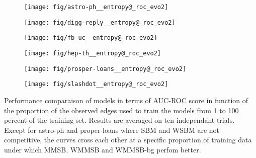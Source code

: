 
\begin{subfigure}
     \centering
         \texttt{[image: fig/astro-ph\_\_entropy@\_roc\_evo2]}
\end{subfigure}
\begin{subfigure}
         \centering
      \texttt{[image: fig/digg-reply\_\_entropy@\_roc\_evo2]}               
\end{subfigure}                                                                          
\begin{subfigure}                                                                        
         \centering                                                                      
      \texttt{[image: fig/fb\_uc\_\_entropy@\_roc\_evo2]}
\end{subfigure}                                                                          
\begin{subfigure}                                                                        
         \centering                                                                      
      \texttt{[image: fig/hep-th\_\_entropy@\_roc\_evo2]}
\end{subfigure}                                                                          
\begin{subfigure}
         \centering
      \texttt{[image: fig/prosper-loans\_\_entropy@\_roc\_evo2]}
\end{subfigure}                                                             
\begin{subfigure}                                                           
         \centering                                                         
      \texttt{[image: fig/slashdot\_\_entropy@\_roc\_evo2]}
\end{subfigure}                                                             
\caption{Performance comparaison of models in terms of AUC-ROC score in function of the proportion of the observed edges used to train the models from 1 to 100 percent of the training set. Results are averaged on ten independant trials. Except for astro-ph and proper-loans where SBM and WSBM are not competitive, the curves cross each other at a specific proportion of training data under which MMSB, WMMSB and WMMSB-bg perfom better. }

